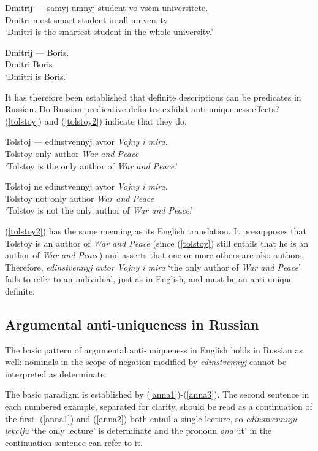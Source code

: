 \begin{exe}
	\ex \label{dmitri-boris} \gll Dmitrij --- samyj umnyj student vo vs\"{e}m universitete.\\
	Dmitri {} most smart student in all university\\
	\glt `Dmitri is the smartest student in the whole university.'

	\ex \label{dmitri-boris2} \gll Dmitrij --- Boris.\\
	Dmitri {} Boris\\
	\glt `Dmitri is Boris.'
\end{exe}

It has therefore been established that definite descriptions can be predicates in Russian. Do Russian predicative definites exhibit anti-uniqueness effects? (\ref{tolstoy}) and (\ref{tolstoy2}) indicate that they do.

\begin{exe}
	\ex \label{tolstoy} \gll Tolstoj --- edinstvennyj avtor \textit{Vojny i mira}.\\
	Tolstoy {} only author \textit{War and Peace}\\
	\glt `Tolstoy is the only author of \textit{War and Peace}.'

	\ex \label{tolstoy2} \gll Tolstoj ne edinstvennyj avtor \textit{Vojny i mira}.\\
	Tolstoy not only author \textit{War and Peace}\\
	\glt `Tolstoy is not the only author of \textit{War and Peace}.'
\end{exe}

(\ref{tolstoy2}) has the same meaning as its English translation. It presupposes that Tolstoy is an author of \textit{War and Peace} (since (\ref{tolstoy}) still entails that he is an author of \textit{War and Peace}) and asserts that one or more others are also authors. Therefore, \textit{edinstvennyj avtor Vojny i mira} `the only author of \textit{War and Peace}' fails to refer to an individual, just as in English, and must be an anti-unique definite.

\subsection{Argumental anti-uniqueness in Russian}
The basic pattern of argumental anti-uniqueness in English holds in Russian as well: nominals in the scope of negation modified by \textit{edinstvennyj} cannot be interpreted as determinate.

The basic paradigm is established by (\ref{anna1})-(\ref{anna3}). The second sentence in each numbered example, separated for clarity, should be read as a continuation of the first. (\ref{anna1}) and (\ref{anna2}) both entail a single lecture, so \textit{edinstvennuju lekciju} `the only lecture' is determinate and the pronoun \textit{ona} `it' in the continuation sentence can refer to it.

